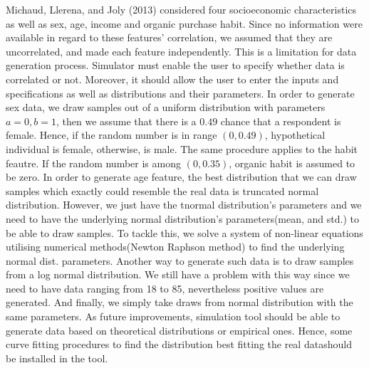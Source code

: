 \documentclass[12pt,]{article}
\begin{document}
Michaud, Llerena, and Joly (2013) considered four socioeconomic
characteristics as well as sex, age, income and organic purchase habit.
Since no information were available in regard to these features'
correlation, we assumed that they are uncorrelated, and made each
feature independently. This is a limitation for data generation process.
Simulator must enable the user to specify whether data is correlated or
not. Moreover, it should allow the user to enter the inputs and
specifications as well as distributions and their parameters. In order
to generate sex data, we draw samples out of a uniform distribution with
parameters \(a=0,b=1\), then we assume that there is a \(0.49\) chance
that a respondent is female. Hence, if the random number is in range
\((0,0.49)\), hypothetical individual is female, otherwise, is male. The
same procedure applies to the habit feautre. If the random number is
among \((0,0.35)\), organic habit is assumed to be zero. In order to
generate age feature, the best distribution that we can draw samples
which exactly could resemble the real data is truncated normal
distribution. However, we just have the tnormal distribution's
parameters and we need to have the underlying normal distribution's
parameters(mean, and std.) to be able to draw samples. To tackle this,
we solve a system of non-linear equations utilising numerical
methods(Newton Raphson method) to find the underlying normal dist.
parameters. Another way to generate such data is to draw samples from a
log normal distribution. We still have a problem with this way since we
need to have data ranging from 18 to 85, nevertheless positive values
are generated. And finally, we simply take draws from normal
distribution with the same parameters. As future improvements,
simulation tool should be able to generate data based on theoretical
distributions or empirical ones. Hence, some curve fitting procedures to
find the distribution best fitting the real datashould be installed in
the tool.
\end{document}
